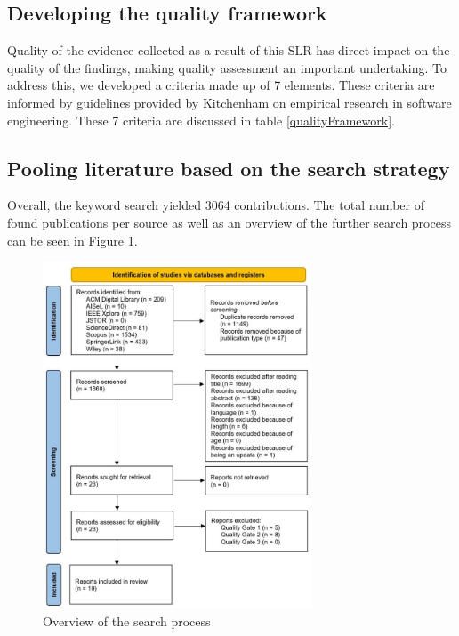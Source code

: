 \documentclass[a4paper,11pt,article,oneside]{memoir}
\begin{document}
\subsection{Developing the quality framework}

Quality of the evidence collected as a result of this SLR has direct impact on the quality of the findings, making quality assessment an important undertaking. To address this, we developed a criteria made up of 7 elements. These criteria are informed by guidelines provided by Kitchenham \cite{Kitchenham.2004} on empirical research in software engineering. These 7 criteria are discussed in table \ref{qualityFramework}.


\subsection{Pooling literature based on the search strategy}
Overall, the keyword search yielded 3064 contributions. The total number of found publications per source as well as an overview of the further search process can be seen in Figure 1.

\begin{figure}[h]
    \centering 
    \includegraphics[width=8cm]{Media/PRISMA-Flowchart.JPG}
    \caption{Overview of the search process}
    \label{fig:PRISMA}
\end{figure}
\end{document}
